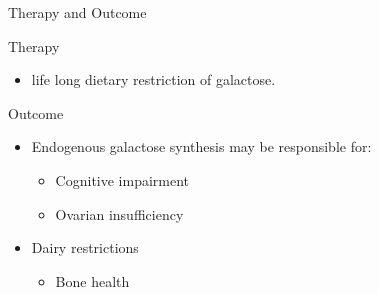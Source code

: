 \documentclass[presentation, smaller]{beamer}
\begin{document}
\begin{frame}[label={sec:orged125d5}]{Therapy and Outcome}
\begin{block}{Therapy}
\begin{itemize}
\item life long dietary restriction of galactose.
\end{itemize}
\end{block}

\begin{block}{Outcome}
\begin{itemize}
\item Endogenous galactose synthesis may be responsible for:
\begin{itemize}
\item Cognitive impairment
\item Ovarian insufficiency
\end{itemize}
\item Dairy restrictions
\begin{itemize}
\item Bone health
\end{itemize}
\end{itemize}
\end{block}
\end{frame}
\end{document}
